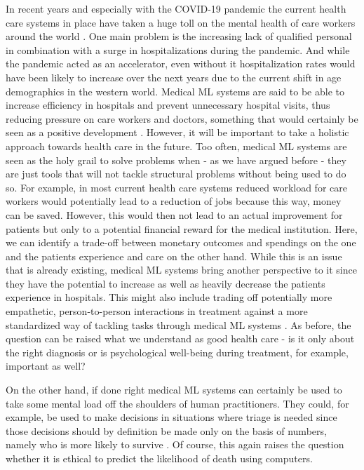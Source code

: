 In recent years and especially with the COVID-19 pandemic the current health care systems in place have taken a huge toll on the mental health of care workers around the world \cite{vizheh2020mental}. One main problem is the increasing lack of qualified personal in combination with a surge in hospitalizations during the pandemic. And while the pandemic acted as an accelerator, even without it hospitalization rates would have been likely to increase over the next years due to the current shift in age demographics in the western world. Medical ML systems are said to be able to increase efficiency in hospitals and prevent unnecessary hospital visits, thus reducing pressure on care workers and doctors, something that would certainly be seen as a positive development \cite{horgan2019artificial}. However, it will be important to take a holistic approach towards health care in the future. Too often, medical ML systems are seen as the holy grail to solve problems when - as we have argued before - they are just tools that will not tackle structural problems without being used to do so. For example, in most current health care systems reduced workload for care workers would potentially lead to a reduction of jobs because this way, money can be saved. However, this would then not lead to an actual improvement for patients but only to a potential financial reward for the medical institution. Here, we can identify a trade-off between monetary outcomes and spendings on the one and the patients experience and care on the other hand. While this is an issue that is already existing, medical ML systems bring another perspective to it since they have the potential to increase as well as heavily decrease the patients experience in hospitals. 
This might also include trading off potentially more empathetic, person-to-person interactions in treatment against a more standardized way of tackling tasks through medical ML systems \cite{Morley2020}. As before, the question can be raised what we understand as good health care - is it only about the right diagnosis or is psychological well-being during treatment, for example, important as well? 

On the other hand, if done right medical ML systems can certainly be used to take some mental load off the shoulders of human practitioners. They could, for example, be used to make decisions in situations where triage is needed since those decisions should by definition be made only on the basis of numbers, namely who is more likely to survive \cite{topol2019high, he2019practical}. Of course, this again raises the question whether it is ethical to predict the likelihood of death using computers.

